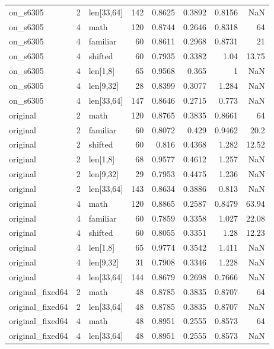 \begin{table}
\begin{tabular}{lrlrrrrr}
on\_s6305 & 2 & len[33,64] & 142 & 0.8625 & 0.3892 & 0.8156 & NaN \\
on\_s6305 & 4 & math & 120 & 0.8744 & 0.2646 & 0.8318 & 64 \\
on\_s6305 & 4 & familiar & 60 & 0.8611 & 0.2968 & 0.8731 & 21 \\
on\_s6305 & 4 & shifted & 60 & 0.7935 & 0.3382 & 1.04 & 13.75 \\
on\_s6305 & 4 & len[1,8] & 65 & 0.9568 & 0.365 & 1 & NaN \\
on\_s6305 & 4 & len[9,32] & 28 & 0.8399 & 0.3077 & 1.284 & NaN \\
on\_s6305 & 4 & len[33,64] & 147 & 0.8646 & 0.2715 & 0.773 & NaN \\
original & 2 & math & 120 & 0.8765 & 0.3835 & 0.8661 & 64 \\
original & 2 & familiar & 60 & 0.8072 & 0.429 & 0.9462 & 20.2 \\
original & 2 & shifted & 60 & 0.816 & 0.4368 & 1.282 & 12.52 \\
original & 2 & len[1,8] & 68 & 0.9577 & 0.4612 & 1.257 & NaN \\
original & 2 & len[9,32] & 29 & 0.7953 & 0.4475 & 1.236 & NaN \\
original & 2 & len[33,64] & 143 & 0.8634 & 0.3886 & 0.813 & NaN \\
original & 4 & math & 120 & 0.8865 & 0.2587 & 0.8479 & 63.94 \\
original & 4 & familiar & 60 & 0.7859 & 0.3358 & 1.027 & 22.08 \\
original & 4 & shifted & 60 & 0.8055 & 0.3351 & 1.28 & 12.23 \\
original & 4 & len[1,8] & 65 & 0.9774 & 0.3542 & 1.411 & NaN \\
original & 4 & len[9,32] & 31 & 0.7908 & 0.3346 & 1.228 & NaN \\
original & 4 & len[33,64] & 144 & 0.8679 & 0.2698 & 0.7666 & NaN \\
original\_fixed64 & 2 & math & 48 & 0.8785 & 0.3835 & 0.8707 & 64 \\
original\_fixed64 & 2 & len[33,64] & 48 & 0.8785 & 0.3835 & 0.8707 & NaN \\
original\_fixed64 & 4 & math & 48 & 0.8951 & 0.2555 & 0.8573 & 64 \\
original\_fixed64 & 4 & len[33,64] & 48 & 0.8951 & 0.2555 & 0.8573 & NaN \\
\bottomrule
\end{tabular}
\end{table}
